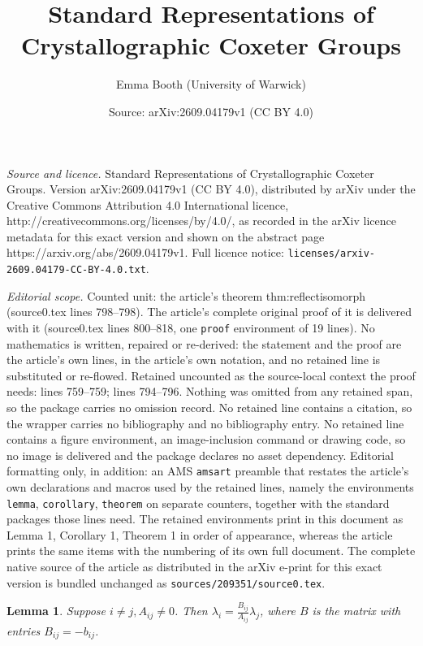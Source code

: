 \documentclass[10pt,a4paper]{amsart}
\title{Standard Representations of Crystallographic Coxeter Groups}
\author{Emma Booth (University of Warwick)}
\date{Source: arXiv:2609.04179v1 (CC BY 4.0)}
\newtheorem{lemma}{Lemma}
\begin{document}
\maketitle

\noindent\emph{Source and licence.} Standard Representations of Crystallographic Coxeter Groups. Version arXiv:2609.04179v1 (CC BY 4.0), distributed by arXiv under the Creative Commons Attribution 4.0 International licence, http://creativecommons.org/licenses/by/4.0/, as recorded in the arXiv licence metadata for this exact version and shown on the abstract page https://arxiv.org/abs/2609.04179v1. Full licence notice: \texttt{licenses/arxiv-2609.04179-CC-BY-4.0.txt}.\par\smallskip

\noindent\textit{Editorial scope.} Counted unit: the article's theorem thm:reflectisomorph (source0.tex lines 798--798). The article's complete original proof of it is delivered with it (source0.tex lines 800--818, one \texttt{proof} environment of 19 lines). No mathematics is written, repaired or re-derived: the statement and the proof are the article's own lines, in the article's own notation, and no retained line is substituted or re-flowed.  Retained uncounted as the source-local context the proof needs: lines 759--759; lines 794--796.  Nothing was omitted from any retained span, so the package carries no omission record.  No retained line contains a citation, so the wrapper carries no bibliography and no bibliography entry.  No retained line contains a figure environment, an image-inclusion command or drawing code, so no image is delivered and the package declares no asset dependency.  Editorial formatting only, in addition: an AMS \texttt{amsart} preamble that restates the article's own declarations and macros used by the retained lines, namely the environments \texttt{lemma}, \texttt{corollary}, \texttt{theorem} on separate counters, together with the standard packages those lines need.  The retained environments print in this document as Lemma 1, Corollary 1, Theorem 1 in order of appearance, whereas the article prints the same items with the numbering of its own full document.  The complete native source of the article as distributed in the arXiv e-print for this exact version is bundled unchanged as \texttt{sources/209351/source0.tex}.
\begin{lemma} \label{lem:isomorphcond} Suppose $i \neq j, A_{ij} \neq 0$. Then $\lambda_i = \frac{B_{ij}}{A_{ij}} \lambda_j$, where $B$ is the matrix with entries $B_{ij} = -b_{ij}$.\end{lemma}
\end{document}
